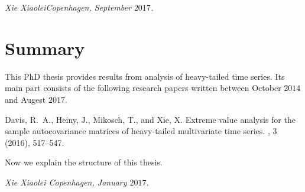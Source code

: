 {\em Xie Xiaolei\qquad \qquad \qquad \qquad \qquad Copenhagen, September $2017$.}


\chapter*{Summary}
This PhD thesis provides results from analysis of heavy-tailed time
series. Its main part consists of the following research papers
written between October $2014$ and Augest $2017$.


\begin{enumerate}
{\sc Davis, R.~A., Heiny, J., Mikosch, T., and Xie, X.}
\newblock Extreme value analysis for the sample autocovariance matrices of
  heavy-tailed multivariate time series.
, 3 (2016), 517--547. \href{http://link.springer.com/article/10.1007/s10687-016-0251-7}{\blue{[pdf]}}
\end{enumerate}

Now we explain the structure of this thesis.

{\em Xie Xiaolei \qquad \qquad \qquad \qquad \qquad Copenhagen, January $2017$.}

\newpage
\tableofcontents

\mainmatter

\def\phdthesis{1}




% 


\newpage
\leavevmode\thispagestyle{empty}
\phantom{bla}








